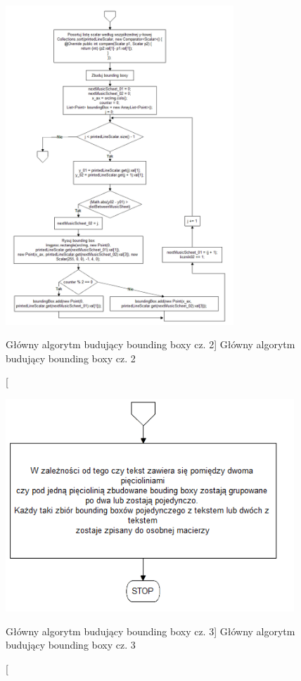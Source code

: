 \documentclass[a4paper,12pt]{article}
\begin{document}
			\newpage
			
	        \begin{figure}[!ht]  
			    \begin{center}
				    \includegraphics[height=12cm] {image//algorithm//majorProcesing_02.png} 
			    \end{center}
			    \caption
    			    [Główny algorytm budujący bounding boxy cz. 2]  
    			    {Główny algorytm budujący bounding boxy cz. 2}  
		    \end{figure} 
		
		    \begin{figure}[!ht]  
			    \begin{center}
				    \includegraphics[height=8cm] {image//algorithm//majorProcesing_03.png} 
			    \end{center}
			    \caption
    			    [Główny algorytm budujący bounding boxy cz. 3]
    			    {Główny algorytm budujący bounding boxy cz. 3}  
		    \end{figure} 
		
\end{document}
